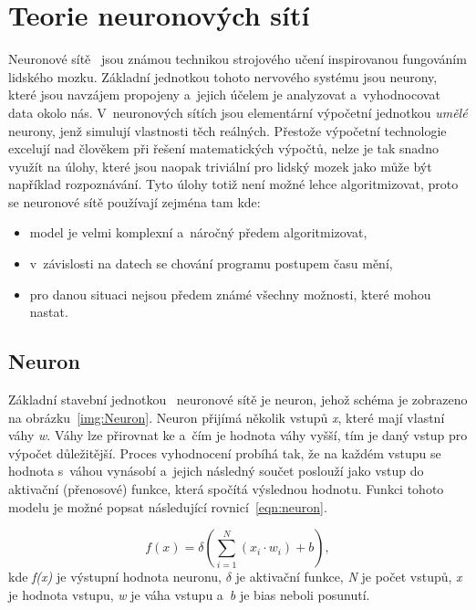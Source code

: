 \section{Teorie neuronových sítí}
Neuronové sítě~\cite{book:NNandDL} jsou známou technikou strojového učení inspirovanou fungováním lidského mozku. Základní jednotkou tohoto nervového systému jsou neurony, které jsou navzájem propojeny a~jejich účelem je analyzovat a~vyhodnocovat data okolo nás. V~neuronových sítích jsou elementární výpočetní jednotkou \emph{umělé} neurony, jenž simulují vlastnosti těch reálných. Přestože výpočetní technologie excelují nad člověkem při řešení matematických výpočtů, nelze je tak snadno využít na úlohy, které jsou naopak triviální pro lidský mozek jako může být například rozpoznávání. Tyto úlohy totiž není možné lehce algoritmizovat, proto se neuronové sítě používají zejména tam kde:
\begin{itemize}
    \item model je velmi komplexní a~náročný předem algoritmizovat,
    \item v~závislosti na datech se chování programu postupem času mění,
    \item pro danou situaci nejsou předem známé všechny možnosti, které mohou nastat.
\end{itemize}

\subsection{Neuron}
\label{sec:Neuron}
Základní stavební jednotkou~\cite{book:NNandDL} neuronové sítě je neuron, jehož schéma je zobrazeno na obrázku~\ref{img:Neuron}. Neuron přijímá několik vstupů \emph{x}, které mají vlastní váhy \emph{w}. Váhy lze přirovnat ke \emph{} a~čím je hodnota váhy vyšší, tím je daný vstup pro výpočet důležitější. Proces vyhodnocení probíhá tak, že na každém vstupu se hodnota s~váhou vynásobí a~jejich následný součet poslouží jako vstup do aktivační (přenosové) funkce, která spočítá výslednou hodnotu. Funkci tohoto modelu je možné popsat následující rovnicí~\ref{eqn:neuron}.

\begin{equation}
    \label{eqn:neuron}
    f(x) = \delta(\sum_{i=1}^{N}(x_i \cdot w_i) + b),
\end{equation}
kde \emph{f(x)} je výstupní hodnota neuronu, $\delta$ je aktivační funkce, \emph{N} je počet vstupů, \emph{x} je hodnota vstupu, \emph{w} je váha vstupu a~\emph{b} je bias neboli posunutí.

